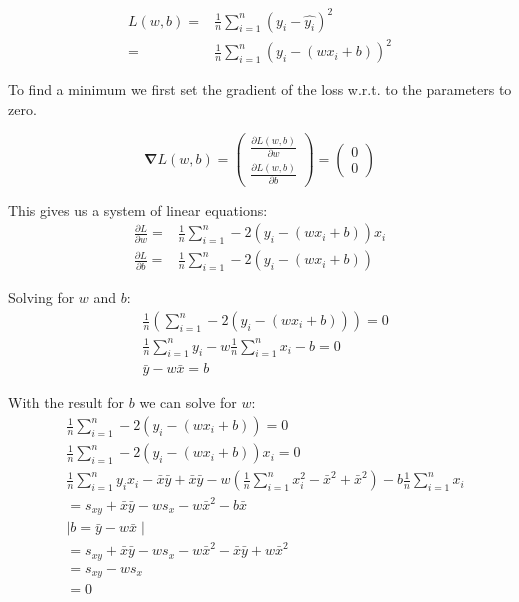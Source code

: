 \begin{align}
  L(w,b) =& \frac{1}{n}\sum_{i=1}^{n}(y_{i}-\hat{y_{i}})^2 \\
         =& \frac{1}{n}\sum_{i=1}^{n}(y_{i}-(wx_{i}+b))^2
\end{align}

To find a minimum we first set the gradient of the loss w.r.t. to the parameters to zero.

\begin{equation*}
  \bm{\nabla} L(w,b) =  
  \begin{pmatrix}
      \frac{\partial L(w,b)}{\partial w} \\
      \frac{\partial L(w,b)}{\partial b} 
  \end{pmatrix}
  =
  \begin{pmatrix}
      0 \\
      0 
  \end{pmatrix}
\end{equation*}

This gives us a system of linear equations:
\begin{align}
  \frac{\partial L}{\partial w} =& \frac{1}{n}\sum_{i=1}^{n}-2(y_{i}-(wx_{i}+b))x_{i}\\
  \frac{\partial L}{\partial b} =& \frac{1}{n}\sum_{i=1}^{n}-2(y_{i}-(wx_{i}+b))
\end{align}

Solving for $w$ and $b$:
\begin{align}
  &\frac{1}{n}\left(\sum_{i=1}^{n}-2(y_{i}-(wx_{i}+b))\right)=0\\
  &\frac{1}{n}\sum_{i=1}^{n}y_{i}-w\frac{1}{n}\sum_{i=1}^{n}x_{i}-b=0\\
  &\bar{y}-w\bar{x} =b
\end{align}

With the result for $b$ we can solve for $w$:
\begin{align}
    & \frac{1}{n}\sum_{i=1}^{n}-2(y_{i}-(wx_{i}+b))=0 \\
    & \frac{1}{n}\sum_{i=1}^{n}-2(y_{i}-(wx_{i}+b))x_{i}=0\\
    & \frac{1}{n}\sum_{i=1}^{n}y_{i}x_{i}-\bar{x}\bar{y}+\bar{x}\bar{y}-w(\frac{1}{n}\sum_{i=1}^{n}x_{i}^2-\bar{x}^2+\bar{x}^2)-b\frac{1}{n}\sum_{i=1}^{n}x_{i} \\
    & = s_{xy} + \bar{x}\bar{y}-w s_{x}-w\bar{x}^2-b\bar{x}\\
    & \mid b=\bar{y}-w\bar{x}\mid\\
    & = s_{xy}+\bar{x}\bar{y}-w s_{x}-w\bar{x}^2-\bar{x}\bar{y}+w\bar{x}^2\\
    & = s_{xy} -w s_{x}\\
    & =0
\end{align}

